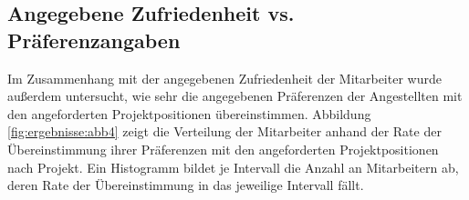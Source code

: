 \subsection{Angegebene Zufriedenheit vs. Präferenzangaben}
Im Zusammenhang mit der angegebenen Zufriedenheit der Mitarbeiter wurde außerdem untersucht, wie sehr die angegebenen Präferenzen der Angestellten mit den angeforderten Projektpositionen übereinstimmen.
Abbildung \ref{fig:ergebnisse:abb4} zeigt die Verteilung der Mitarbeiter anhand der Rate der Übereinstimmung ihrer Präferenzen mit den angeforderten Projektpositionen nach Projekt.
Ein Histogramm bildet je Intervall die Anzahl an Mitarbeitern ab, deren Rate der Übereinstimmung in das jeweilige Intervall fällt.

\begin{figure}[H]
    \centering
    \\

\end{figure}

